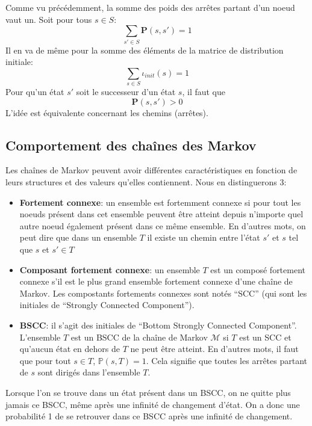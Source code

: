 \documentclass[letterpaper]{article}
\begin{document}
  
    Comme vu précédemment, la somme des poids des arrêtes partant d'un noeud vaut un.
    Soit pour tous $s \in S$:
    $$\sum\limits_{s' \in S} \mathbf{P}(s, s') = 1$$
    Il en va de même pour la somme des éléments de la matrice de distribution initiale:
    $$\sum\limits_{s \in S} \iota_{init}(s) = 1$$
    Pour qu'un état $s'$ soit le successeur d'un état $s$, il faut que 
    $$\mathbf{P}(s, s') > 0$$
    L'idée est équivalente concernant les chemins (arrêtes).
    
  \subsection{Comportement des chaînes des Markov}
    Les chaînes de Markov peuvent avoir différentes caractéristiques en fonction 
    de leurs structures et des valeurs qu'elles contiennent.  
    Nous en distinguerons 3:
    \begin{itemize}
     \item \textbf{Fortement connexe}: un ensemble est fortemment connexe si pour tout
      les noeuds présent dans cet ensemble peuvent être atteint depuis n'importe quel
      autre noeud également présent dans ce même ensemble.  En d'autres mots, on peut dire 
      que dans un ensemble $T$ il existe un chemin entre l'état $s'$ et $s$ tel que 
      $s$ et $s' \in T$
     \item \textbf{Composant fortement connexe}: un ensemble $T$ est un composé fortement
      connexe s'il est le plus grand ensemble fortement connexe d'une chaîne de Markov.  
      Les compostants fortements connexes sont notés ``SCC'' (qui sont les initiales de
      ``Strongly Connected Component'').
     \item \textbf{BSCC}: il s'agit des initiales de ``Bottom Strongly Connected Component''.
      L'ensemble $T$ est un BSCC de la chaîne de Markov $\mathcal{M}$ si $T$ est un SCC et
      qu'aucun état en dehors de $T$ ne peut être atteint.  En d'autres mots, il faut que
      pour tout $s \in T$, $\mathbb{P}(s, T) = 1$.  Cela signifie que toutes les 
      arrêtes partant de $s$ sont dirigés dans l'ensemble $T$.
    \end{itemize}
    Lorsque l'on se trouve dans un état présent dans un BSCC, on ne quitte plus jamais ce
    BSCC, même après une infinité de changement d'état.  On a donc une probabilité 1 de 
    se retrouver dans ce BSCC après une infinité de changement.
  
\end{document}
